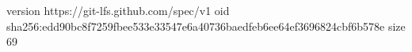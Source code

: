 version https://git-lfs.github.com/spec/v1
oid sha256:edd90bc8f7259fbee533e33547e6a40736baedfeb6ee64ef3696824cbf6b578e
size 69
